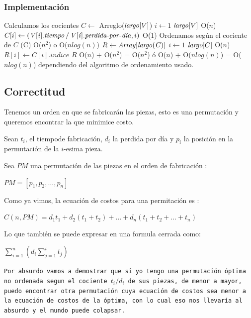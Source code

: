 \documentclass[11pt,a4paper]{article}
\newcommand{\Suma}[2]{\displaystyle\sum\limits_{#1}^{#2}}
\newcommand{\bc}{\begin{center}}
\newcommand{\ec}{\end{center}}
\begin{document}
\subsubsection*{Implementación}

\begin{codebox}
\zi
  \Comment Calculamos los cocientes
\li $C \gets$ Arreglo($\id{largo}[V]$)
\li \For $i \gets 1$ \To $\id{largo}[V]$  \RComment O($n$)
\li   \Do
\li     $C[i] \gets (\id{V[i].tiempo} / \id{V[i].perdida-por-dia}, i) $  
     \End
     \RComment O(1)
\zi
  \Comment Ordenamos según el cociente de $C$
\li {}(C) \RComment O($n^2$) o O($nlog(n)$)
\li $R \gets  \id{Array[largo(C)]}$
\li \For $i \gets 1$ \To $\id{largo}[C]$ \RComment O($n$)
\li   \Do
\li     $R[i] \gets C[i].indice$
      \End
\li \Return $R$
\RComment O($n$) + O($n^2$) = O($n^2$) ó \zi
\RComment O($n$) + O($nlog(n)$) = O($nlog(n)$) \zi \RComment dependiendo del algoritmo de ordenamiento usado.
\end{codebox}

\subsection{Correctitud}

Tenemos un orden en que se fabricarán las piezas, esto es una permutación y queremos encontrar la que minimice costo.

Sean $t_i$, el tiempode fabricaci\'on, $d_i$ la perdida por día y $p_i$ la posición en la permutación de la $i$-esima pieza.

Sea $PM$ una permutaci\'on de las piezas en el orden de fabricaci\'on :

\bc
$PM = [p_1, p_2, \ldots , p_n]$
\ec

Como ya vimos, la ecuaci\'on de costos para una permitaci\'on es :

\bc
$C(n, PM) = d_1t_1 + d_2(t_1 + t_2) + \ldots + d_n(t_1 + t_2 + \ldots +t_n)$\\
\ec

Lo que tambi\'en se puede expresar en una formula cerrada como:

\bc
$\Suma{i=1}{n}(d_i \Suma{j=1}{i}t_j)$
\ec

\texttt{Por absurdo vamos a demostrar que si yo tengo una permutaci\'on \'optima no ordenada segun el cociente $t_i/d_i$ de sus piezas, de menor a mayor, puedo encontrar otra permutaci\'on cuya ecuaci\'on de costos sea menor a la ecuaci\'on de costos de la \'optima, con lo cual eso nos llevar\'ia al absurdo y el mundo puede colapsar.}
\end{document}
